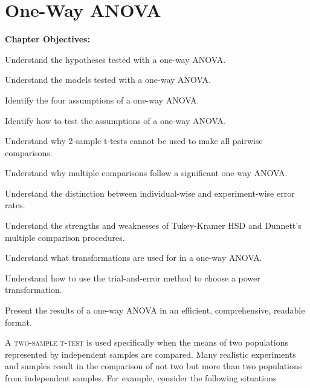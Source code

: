\documentclass[10pt,openany]{book}\usepackage[]{graphicx}\usepackage[]{color}
\begin{document}
\chapter{One-Way ANOVA}  \label{chap:LMANOVA1}
  \vspace{-21pt}
    \begin{ChapObj}{\boxwidth}
      \textbf{Chapter Objectives:}
        \begin{Enumerate}
          \item Understand the hypotheses tested with a one-way ANOVA.
          \item Understand the models tested with a one-way ANOVA.
          \item Identify the four assumptions of a one-way ANOVA.
          \item Identify how to test the assumptions of a one-way ANOVA.
          \item Understand why 2-sample t-tests cannot be used to make all pairwise comparisons.
          \item Understand why multiple comparisons follow a significant one-way ANOVA.
          \item Understand the distinction between individual-wise and experiment-wise error rates.
          \item Understand the strengths and weaknesses of Tukey-Kramer HSD and Dunnett's multiple comparison procedures.
          \item Understand what transformations are used for in a one-way ANOVA.
          \item Understand how to use the trial-and-error method to choose a power transformation.
          \item Present the results of a one-way ANOVA in an efficient, comprehensive, readable format.
       \end{Enumerate}
    \end{ChapObj}
  \vspace{-39pt}
\minitoc
\newpage

\lettrine{A}{ two-sample t-test} is used specifically when the means of two populations represented by independent samples are compared.  Many realistic experiments and samples result in the comparison of not two but more than two populations from independent samples.  For example, consider the following situations
\end{document}
